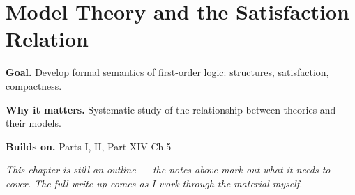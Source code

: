 \chapter{Model Theory and the Satisfaction Relation}
\label{ch:14-metamathematics-07}

\begin{chapterintro}
\textbf{Goal.} Develop formal semantics of first-order logic: structures, satisfaction, compactness.

\textbf{Why it matters.} Systematic study of the relationship between theories and their models.

\textbf{Builds on.} Parts I, II, Part XIV Ch.5
\end{chapterintro}

\textit{This chapter is still an outline --- the notes above mark out what it needs to cover. The full write-up comes as I work through the material myself.}

